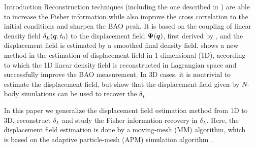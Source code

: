 \begin{section}{Introduction}
Reconstruction techniques (including the one described in 
\cite{bib:HarnoisD2013}) are able to increase the Fisher information
while also improve the cross correlation to the initial conditions
and sharpen the BAO peak. It is based on the coupling of linear
density field $\delta_L(\boldsymbol{q},t_0)$ to the displacement field
$\boldsymbol\Psi(\boldsymbol{q})$, first derived by \cite{bib:Zel1970}, and
the displacement field is estimated by a smoothed final density field.
\cite{bib:Zhu2016} shows a new method in the estimation of displacement
field in 1-dimensional (1D), according to which the 1D linear density
field is reconstructed in Lagrangian space and successfully improve
the BAO measurement. In 3D cases, it is nontrivial to estimate
the displacement field, but \cite{bib:Yu2016} show that the displacement
field given by $N$-body simulations can be used to recover the $\delta_L$.

In this paper we generalize the displacement field estimation method
from 1D \citep{bib:Zhu2016} to 3D, reconstruct $\delta_L$ and study
the Fisher information recovery in $\delta_L$. Here, the displacement field
estimation is done by a moving-mesh (MM) algorithm, which is based on
the adaptive particle-mesh (APM) simulation algorithm \citep{bib:Pen1995,bib:Pen1998}.






\end{section}
